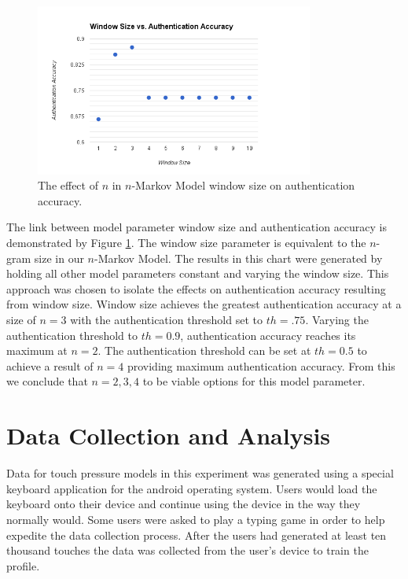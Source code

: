 \documentclass{acm_proc_article-sp}
\begin{document}
\begin{figure}
\centering
\includegraphics[width=3.6in]{window_size_vs_authentication_accuracy.png}
\caption{The effect of $n$ in $n$-Markov Model window size on authentication accuracy.}
\label{fig:window_size_vs_authentication_accuracy}
\end{figure}

The link between model parameter window size and authentication accuracy is demonstrated by Figure \ref{fig:window_size_vs_authentication_accuracy}.
The window size parameter is equivalent to the $n$-gram size in our $n$-Markov Model.
The results in this chart were generated by holding all other model parameters constant and varying the window size. This approach was chosen to isolate the effects on authentication accuracy resulting from window size.
Window size achieves the greatest authentication accuracy at a size of $n=3$ with the authentication threshold set to $th=.75$.
Varying the authentication threshold to $th=0.9$, authentication accuracy reaches its maximum at $n=2$. 
The authentication threshold can be set at $th=0.5$ to achieve a result of $n=4$ providing maximum authentication accuracy.
From this we conclude that $n={2,3,4}$ to be viable options for this model parameter.


\section{Data Collection and Analysis}
\label{sec:data_collection}
Data for touch pressure models in this experiment was generated using a special keyboard application for the android operating system. Users would load the keyboard onto their device and continue using the device in the way they normally would. Some users were asked to play a typing game in order to help expedite the data collection process. After the users had generated at least ten thousand touches the data was collected from the user's device to train the profile.
\end{document}
